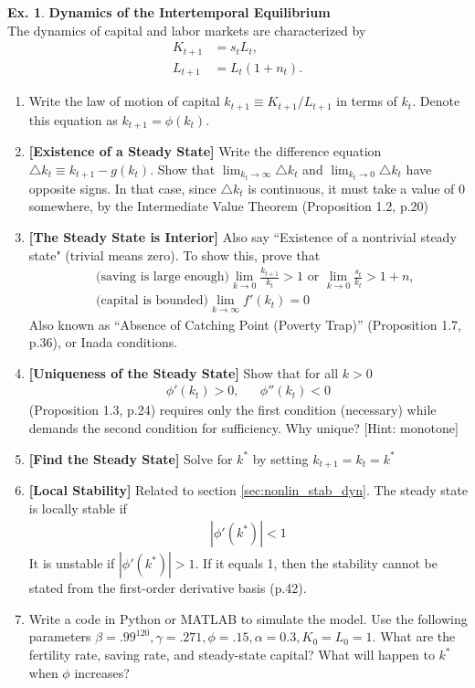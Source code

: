 \documentclass[11pt,a4paper]{book}
\theoremstyle{definition}\newtheorem{definition}{Definition}
\theoremstyle{definition}\newtheorem{fact}{Fact}
\theoremstyle{definition}\newtheorem{remark}{Remark}
\theoremstyle{definition}\newtheorem{ex}{Ex.}
\theoremstyle{definition}\newtheorem{project}{Project}
\theoremstyle{definition}\newtheorem{problem}{Problem}
\theoremstyle{definition}\newtheorem{example}{Example}
\numberwithin{theorem}{section}
\numberwithin{corollary}{chapter}
\numberwithin{assumption}{chapter}
\numberwithin{definition}{chapter}
\numberwithin{prop}{chapter}
\numberwithin{notation}{chapter}
\numberwithin{problem}{chapter}
\numberwithin{example}{chapter}
\numberwithin{fact}{chapter}
\numberwithin{ex}{chapter}
\begin{document}
\begin{ex}
		\textbf{Dynamics of the Intertemporal Equilibrium} \\
		The dynamics of capital and labor markets are characterized by
		\begin{align*}
			K_{t+1} &= s_t L_t, \\
			L_{t+1} &= L_t (1+n_t).
		\end{align*}
		\begin{enumerate}
			\item Write the law of motion of capital $k_{t+1} \equiv K_{t+1}/L_{t+1}$ in terms of $k_t$. Denote this equation as $k_{t+1} = \phi(k_t)$.
			\item \textbf{[Existence of a Steady State]} Write the difference equation $\triangle k_t \equiv k_{t+1} - g(k_t)$. Show that $\lim_{k_t\to\infty} \triangle k_t$ and $\lim_{k_t\to 0} \triangle k_t$ have opposite signs. In that case, since $\triangle k_t$ is continuous, it must take a value of 0 somewhere, by the Intermediate Value Theorem \citep{de2002theory} (Proposition 1.2, p.20)
			\item \textbf{[The Steady State is Interior]} Also say ``Existence of a nontrivial steady state" (trivial means zero). To show this, prove that
			\begin{align*}
				& \text{ (saving is large enough)} \lim_{k\to 0} \frac{k_{t+1}}{k_t} > 1 \text{ or } \lim_{k\to 0} \frac{s_t}{k_t} > 1 + n, \\
				& \text{ (capital is bounded)} \lim_{k\to \infty} f'(k_t) = 0
			\end{align*}
			Also known as ``Absence of Catching Point (Poverty Trap)'' \citep{de2002theory} (Proposition 1.7, p.36), or Inada conditions.
			\item \textbf{[Uniqueness of the Steady State]} Show that for all $k>0$
			\begin{align*}
				\phi'(k_t) > 0, && \phi''(k_t) < 0
			\end{align*}
			\citet{de2002theory} (Proposition 1.3, p.24) requires only the first condition (necessary) while \citet{galor1989existence} demands the second condition for sufficiency. Why unique? [Hint: monotone]
			
			\item \textbf{[Find the Steady State]} Solve for $k^*$ by setting $k_{t+1} = k_t = k^*$
			\item \textbf{[Local Stability]} Related to section \ref{sec:nonlin_stab_dyn}. The steady state is locally stable if
			\begin{align*}
				\left| \phi'(k^*) \right| < 1
			\end{align*}
			It is unstable if $\left| \phi'(k^*) \right| > 1$. If it equals 1, then the stability cannot be stated from the first-order derivative basis \citep{de2002theory} (p.42).
			\item Write a code in Python or MATLAB to simulate the model. Use the following parameters $\beta=.99^{120},\gamma=.271,\phi=.15,\alpha=0.3, K_0=L_0=1$. What are the fertility rate, saving rate, and steady-state capital? What will happen to $k^*$ when $\phi$ increases?
		\end{enumerate}
		

\end{ex}
\end{document}
